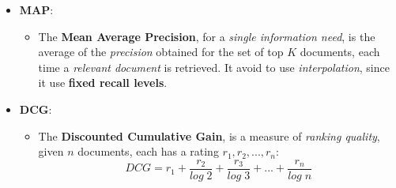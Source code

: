 \documentclass{article}
\begin{document}
\begin{itemize}
\item \textbf{MAP}:
\begin{itemize}
\item The \textbf{Mean Average Precision}, for a \emph{single information need}, is the average of the \emph{precision} obtained for the set of top $K$ documents, each time a \emph{relevant document} is retrieved. It avoid to use \emph{interpolation}, since it use \textbf{fixed recall levels}. 
\end{itemize}
\item \textbf{DCG}:
\begin{itemize}
\item The \textbf{Discounted Cumulative Gain}, is a measure of \emph{ranking quality}, given $n$ documents, each has a rating $r_1, r_2, ... , r_n$:
\[ DCG = r_1 + \frac{r_2}{log\; 2} + \frac{r_3}{log\; 3} + ... + \frac{r_n}{log\; n}\]
\end{itemize}
\end{itemize}
\end{document}

